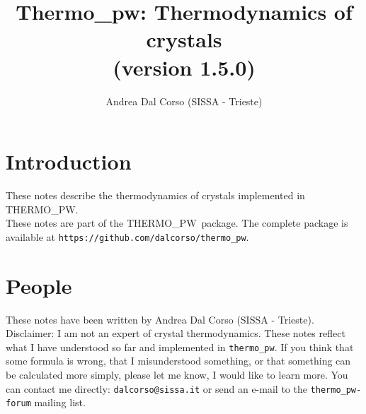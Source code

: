 \documentclass[12pt,a4paper]{article}
\def\version{1.5.0}
\def\tpw{{\sc THERMO\_PW}}
\begin{document}
 
\author{Andrea Dal Corso (SISSA - Trieste)}
\date{}


\title{
  \vskip 1cm
  {\color{red} \Huge Thermo\_pw: Thermodynamics of crystals} \\
  \Large (version \version)
}

\maketitle

\newpage

\tableofcontents

\newpage

\section{{\color{coral}Introduction}}
These notes describe the thermodynamics of crystals implemented in \tpw. \\
These notes are part of the \tpw\ package. The complete package is
available at \texttt{https://github.com/dalcorso/thermo\_pw}.

\newpage
\section{\color{coral}People}
These notes have been written by Andrea Dal Corso (SISSA - Trieste). \\
Disclaimer: I am not an expert of crystal thermodynamics. 
These notes reflect what I have understood so far and implemented in 
\texttt{thermo\_pw}. If you think that some formula is wrong, 
that I misunderstood something, or that something can be calculated more 
simply, please let me know, I would like to learn more. 
You can contact me directly: \texttt{dalcorso@sissa.it} or send an
e-mail to the \texttt{thermo\_pw-forum} mailing list.

\newpage
\end{document}
